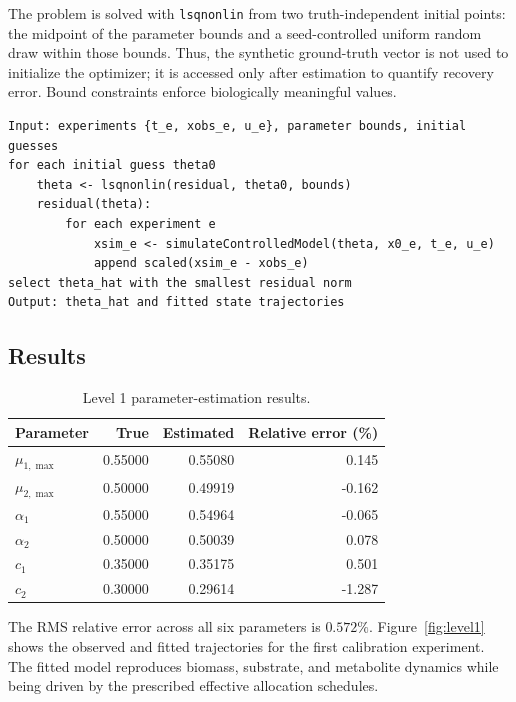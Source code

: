 \documentclass[11pt,a4paper]{article}
\begin{document}
The problem is solved with \texttt{lsqnonlin} from two truth-independent
initial points: the midpoint of the parameter bounds and a seed-controlled
uniform random draw within those bounds. Thus, the synthetic ground-truth
vector is not used to initialize the optimizer; it is accessed only after
estimation to quantify recovery error. Bound constraints enforce biologically
meaningful values.

\noindent\begin{minipage}{\linewidth}
\begin{lstlisting}[style=pseudostyle,title={Compact MATLAB pseudocode}]
Input: experiments {t_e, xobs_e, u_e}, parameter bounds, initial guesses
for each initial guess theta0
    theta <- lsqnonlin(residual, theta0, bounds)
    residual(theta):
        for each experiment e
            xsim_e <- simulateControlledModel(theta, x0_e, t_e, u_e)
            append scaled(xsim_e - xobs_e)
select theta_hat with the smallest residual norm
Output: theta_hat and fitted state trajectories
\end{lstlisting}
\end{minipage}

\subsection{Results}

\begin{table}[H]
\centering
\caption{Level 1 parameter-estimation results.}
\label{tab:level1}
\begin{tabular}{lrrr}
\toprule
Parameter & True & Estimated & Relative error (\%)\\
\midrule
\(\mu_{1,\max}\) & 0.55000 & 0.55080 &  0.145\\
\(\mu_{2,\max}\) & 0.50000 & 0.49919 & -0.162\\
\(\alpha_1\)     & 0.55000 & 0.54964 & -0.065\\
\(\alpha_2\)     & 0.50000 & 0.50039 &  0.078\\
\(c_1\)          & 0.35000 & 0.35175 &  0.501\\
\(c_2\)          & 0.30000 & 0.29614 & -1.287\\
\bottomrule
\end{tabular}
\end{table}

The RMS relative error across all six parameters is \(0.572\%\). Figure~\ref{fig:level1} shows the observed and fitted trajectories for the first calibration experiment. The fitted model reproduces biomass, substrate,
and metabolite dynamics while being driven by the prescribed effective allocation schedules.
\end{document}
